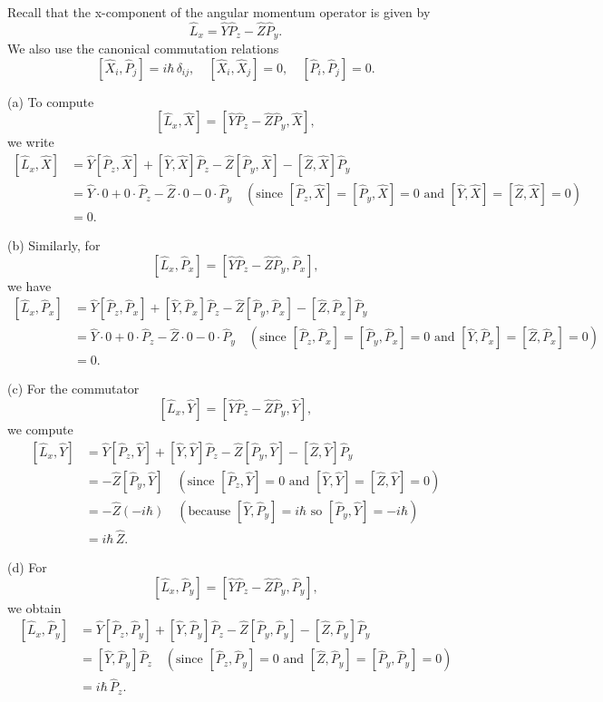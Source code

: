 \documentclass{article}
\begin{document}
Recall that the x-component of the angular momentum operator is given by 
\[
\hat{L}_x = \hat{Y}\hat{P}_z - \hat{Z}\hat{P}_y.
\]
We also use the canonical commutation relations 
\[
[\hat{X}_i, \hat{P}_j] = i\hbar\,\delta_{ij}, \quad [\hat{X}_i, \hat{X}_j] = 0, \quad [\hat{P}_i, \hat{P}_j] = 0.
\]

(a) To compute 
\[
[\hat{L}_x, \hat{X}] = [\hat{Y}\hat{P}_z - \hat{Z}\hat{P}_y, \hat{X}],
\]
we write
\[
\begin{aligned}
[\hat{L}_x, \hat{X}] &= \hat{Y}[\hat{P}_z,\hat{X}] + [\hat{Y},\hat{X}]\hat{P}_z - \hat{Z}[\hat{P}_y,\hat{X}] - [\hat{Z},\hat{X}]\hat{P}_y \\
&= \hat{Y}\cdot 0 + 0\cdot\hat{P}_z - \hat{Z}\cdot 0 - 0\cdot\hat{P}_y \quad (\text{since } [\hat{P}_z,\hat{X}]=[\hat{P}_y,\hat{X}]=0 \text{ and } [\hat{Y},\hat{X}]=[\hat{Z},\hat{X}]=0)\\
&= 0.
\end{aligned}
\]

(b) Similarly, for 
\[
[\hat{L}_x, \hat{P}_x] = [\hat{Y}\hat{P}_z - \hat{Z}\hat{P}_y, \hat{P}_x],
\]
we have
\[
\begin{aligned}
[\hat{L}_x, \hat{P}_x] &= \hat{Y}[\hat{P}_z,\hat{P}_x] + [\hat{Y},\hat{P}_x]\hat{P}_z - \hat{Z}[\hat{P}_y,\hat{P}_x] - [\hat{Z},\hat{P}_x]\hat{P}_y \\
&= \hat{Y}\cdot 0 + 0\cdot\hat{P}_z - \hat{Z}\cdot 0 - 0\cdot\hat{P}_y \quad (\text{since } [\hat{P}_z,\hat{P}_x]=[\hat{P}_y,\hat{P}_x]=0 \text{ and } [\hat{Y},\hat{P}_x]=[\hat{Z},\hat{P}_x]=0)\\
&= 0.
\end{aligned}
\]

(c) For the commutator 
\[
[\hat{L}_x, \hat{Y}] = [\hat{Y}\hat{P}_z - \hat{Z}\hat{P}_y, \hat{Y}],
\]
we compute
\[
\begin{aligned}
[\hat{L}_x, \hat{Y}] &= \hat{Y}[\hat{P}_z,\hat{Y}] + [\hat{Y},\hat{Y}]\hat{P}_z - \hat{Z}[\hat{P}_y,\hat{Y}] - [\hat{Z},\hat{Y}]\hat{P}_y\\[1mm]
&= -\hat{Z}[\hat{P}_y,\hat{Y}] \quad (\text{since } [\hat{P}_z,\hat{Y}]=0 \text{ and } [\hat{Y},\hat{Y}]=[\hat{Z},\hat{Y}]=0)\\[1mm]
&= -\hat{Z}(-i\hbar) \quad (\text{because } [\hat{Y},\hat{P}_y]=i\hbar \text{ so } [\hat{P}_y,\hat{Y}]=-i\hbar)\\[1mm]
&= i\hbar\,\hat{Z}.
\end{aligned}
\]

(d) For 
\[
[\hat{L}_x, \hat{P}_y] = [\hat{Y}\hat{P}_z - \hat{Z}\hat{P}_y, \hat{P}_y],
\]
we obtain
\[
\begin{aligned}
[\hat{L}_x, \hat{P}_y] &= \hat{Y}[\hat{P}_z,\hat{P}_y] + [\hat{Y},\hat{P}_y]\hat{P}_z - \hat{Z}[\hat{P}_y,\hat{P}_y] - [\hat{Z},\hat{P}_y]\hat{P}_y\\[1mm]
&= [\hat{Y},\hat{P}_y]\hat{P}_z \quad (\text{since } [\hat{P}_z,\hat{P}_y]=0 \text{ and } [\hat{Z},\hat{P}_y]=[\hat{P}_y,\hat{P}_y]=0)\\[1mm]
&= i\hbar\,\hat{P}_z.
\end{aligned}
\]
\end{document}
